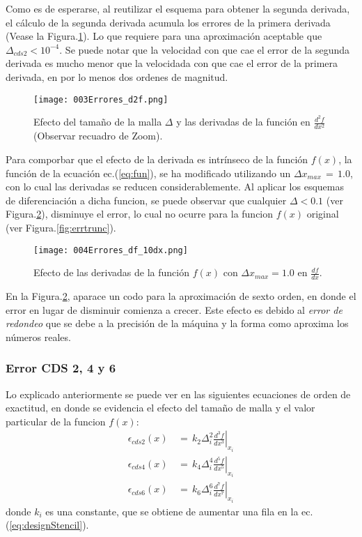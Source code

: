 \documentclass[9pt,technote,twoside,letterpaper,onecolumn]{IEEEtran}
\begin{document}
\begin{multicols}{2}
Como es de esperarse, al reutilizar el esquema para obtener la segunda derivada, el cálculo de la segunda derivada acumula los errores de la primera derivada (Vease la Figura.\ref{fig:err2trunc}). Lo que requiere para una aproximación aceptable que $\Delta_{cds2}<10^{-4}$. Se puede notar que la velocidad con que cae el error de la segunda derivada es mucho menor que la velocidada con que cae el error de la primera derivada, en por lo menos dos ordenes de magnitud.

\begin{figure}[H]
  \centering
  \texttt{[image: 003Errores\_d2f.png]}
  \caption{Efecto del tamaño de la malla $\Delta$ y las derivadas de la función en $\frac{d^2f}{dx^2}$ (Observar recuadro de Zoom).}
  \label{fig:err2trunc}
\end{figure}

Para comporbar que el efecto de la derivada es intrínseco de la función $f(x)$, la función de la ecuación ec.(\ref{eq:fun}), se ha modificado utilizando un $\Delta x_{max}\,=\,1.0$, con lo cual las derivadas se reducen considerablemente. Al aplicar los esquemas de diferenciación a dicha funcion, se puede observar que cualquier $\Delta<0.1$ (ver Figura.\ref{fig:errdxOthertrunc}), disminuye el error, lo cual no ocurre para la funcion $f(x)$ original (ver Figura.\ref{fig:errtrunc}).
\begin{figure}[H]
  \centering
  \texttt{[image: 004Errores\_df\_10dx.png]}
  \caption{Efecto de las derivadas de la función $f(x)$ con $\Delta x_{max}=1.0$ en $\frac{df}{dx}$.}
  \label{fig:errdxOthertrunc}
\end{figure}

En la Figura.\ref{fig:errdxOthertrunc}, aparace un codo para la aproximación de sexto orden, en donde el error en lugar de disminuir comienza a crecer. Este efecto es debido al \emph{error de redondeo} que se debe a la precisión de la máquina y la forma como aproxima los números reales.

\subsubsection{Error CDS 2, 4 y 6}
\label{sec:errcds4}
Lo explicado anteriormente se puede ver en las siguientes ecuaciones de orden de exactitud, en donde se evidencia el efecto del tamaño de malla y el valor particular de la funcion $f(x)$:
\begin{align}
  \epsilon_{cds2}(x)\,&=\,k_2\Delta_i^2\left.\frac{d^3f}{dx^3}\right|_{x_i}
  \label{eq:errcds2}\\
  \epsilon_{cds4}(x)\,&=\,k_4\Delta_i^4\left.\frac{d^5f}{dx^5}\right|_{x_i}
  \label{eq:errcds4}\\
  \epsilon_{cds6}(x)\,&=\,k_6\Delta_i^6\left.\frac{d^7f}{dx^7}\right|_{x_i}
  \label{eq:errcds6}
\end{align}
donde $k_i$ es una constante, que se obtiene de aumentar una fila en la ec.(\ref{eq:designStencil}).


\end{multicols}
\end{document}
